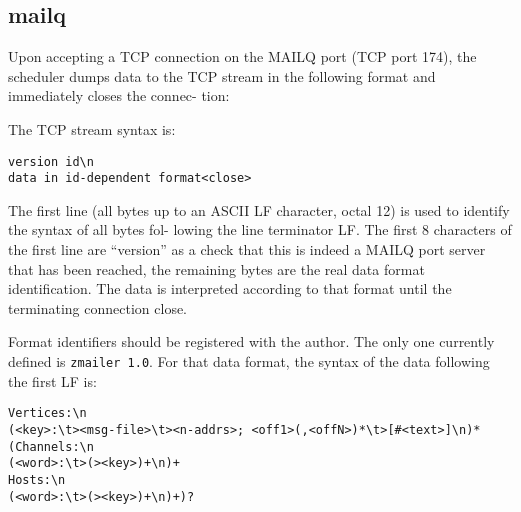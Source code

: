 \subsection{mailq}



Upon  accepting a  TCP  connection on the MAILQ port (TCP
port 174), the scheduler dumps data to the TCP  stream  in
the  following  format  and immediately closes the connec-
tion:

The TCP stream syntax is:
\begin{verbatim}
version id\n
data in id-dependent format<close>
\end{verbatim}


The first line (all bytes up to an ASCII LF character,
octal 12) is used to identify the syntax of all bytes fol-
lowing the line terminator LF.  The first 8 characters  of
the first line are ``version'' as a check that this is
indeed a MAILQ port server that has been reached, the
remaining  bytes are the real data format identification.
The data is interpreted according to that format until the
terminating connection close.

Format identifiers should be registered with the author.
The only one currently defined is {\tt zmailer 1.0}. For that
data format, the syntax of the data following the first LF
is:
\begin{verbatim}
Vertices:\n
(<key>:\t><msg-file>\t><n-addrs>; <off1>(,<offN>)*\t>[#<text>]\n)*
(Channels:\n
(<word>:\t>(><key>)+\n)+
Hosts:\n
(<word>:\t>(><key>)+\n)+)?
\end{verbatim}


